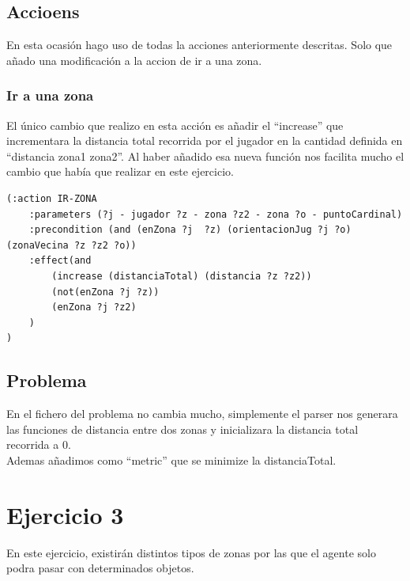 \documentclass[12pt,a4paper]{article}
\begin{document}
\subsection{Accioens}
En esta ocasión hago uso de todas la acciones anteriormente descritas. Solo que añado una modificación a la accion de ir a una zona.
\subsubsection{Ir a una zona}
El único cambio que realizo en esta acción es añadir el ``increase'' que incrementara la distancia total recorrida por el jugador en la cantidad definida en ``distancia zona1 zona2''. Al haber añadido esa nueva función nos facilita mucho el cambio que había que realizar en este ejercicio. 
\begin{lstlisting}
(:action IR-ZONA
	:parameters (?j - jugador ?z - zona ?z2 - zona ?o - puntoCardinal)
	:precondition (and (enZona ?j  ?z) (orientacionJug ?j ?o)(zonaVecina ?z ?z2 ?o))
	:effect(and
		(increase (distanciaTotal) (distancia ?z ?z2))
		(not(enZona ?j ?z))
		(enZona ?j ?z2)
	)
)
\end{lstlisting}
\subsection{Problema}
En el fichero del problema no cambia mucho, simplemente el parser nos generara las funciones de distancia entre dos zonas y  inicializara la distancia total recorrida a 0.\\
Ademas añadimos como ``metric'' que se minimize la distanciaTotal. 

\section{Ejercicio 3}
En este ejercicio, existirán distintos tipos de zonas por las que el agente solo podra pasar con determinados objetos.
\end{document}

